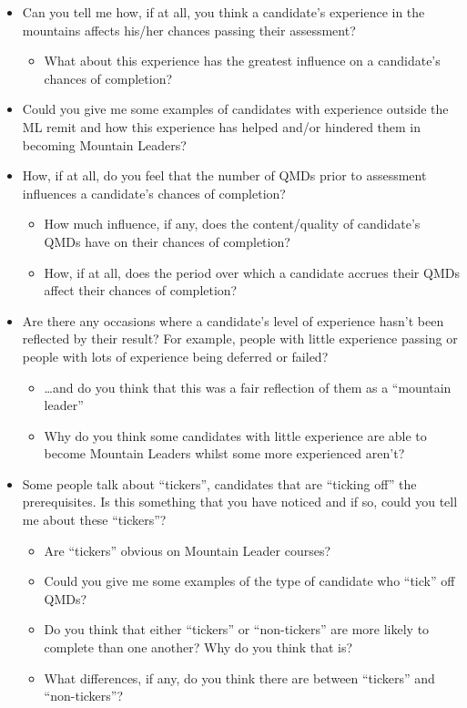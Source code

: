 \documentclass[
  12pt,
  a4paper,
]{book}
\providecommand{\tightlist}{%
  \setlength{\itemsep}{0pt}\setlength{\parskip}{0pt}}
\begin{document}
\begin{itemize}
\tightlist
\item
  Can you tell me how, if at all, you think a candidate's experience in the mountains affects his/her chances passing their assessment?

  \begin{itemize}
  \tightlist
  \item
    What about this experience has the greatest influence on a candidate's chances of completion?
  \end{itemize}
\item
  Could you give me some examples of candidates with experience outside the ML remit and how this experience has helped and/or hindered them in becoming Mountain Leaders?
\item
  How, if at all, do you feel that the number of QMDs prior to assessment influences a candidate's chances of completion?

  \begin{itemize}
  \tightlist
  \item
    How much influence, if any, does the content/quality of candidate's QMDs have on their chances of completion?
  \item
    How, if at all, does the period over which a candidate accrues their QMDs affect their chances of completion?
  \end{itemize}
\item
  Are there any occasions where a candidate's level of experience hasn't been reflected by their result? For example, people with little experience passing or people with lots of experience being deferred or failed?

  \begin{itemize}
  \tightlist
  \item
    \ldots and do you think that this was a fair reflection of them as a ``mountain leader''
  \item
    Why do you think some candidates with little experience are able to become Mountain Leaders whilst some more experienced aren't?
  \end{itemize}
\item
  Some people talk about ``tickers'', candidates that are ``ticking off'' the prerequisites. Is this something that you have noticed and if so, could you tell me about these ``tickers''?

  \begin{itemize}
  \tightlist
  \item
    Are ``tickers'' obvious on Mountain Leader courses?
  \item
    Could you give me some examples of the type of candidate who ``tick'' off QMDs?
  \item
    Do you think that either ``tickers'' or ``non-tickers'' are more likely to complete than one another? Why do you think that is?
  \item
    What differences, if any, do you think there are between ``tickers'' and ``non-tickers''?
  \end{itemize}
\end{itemize}
\end{document}

